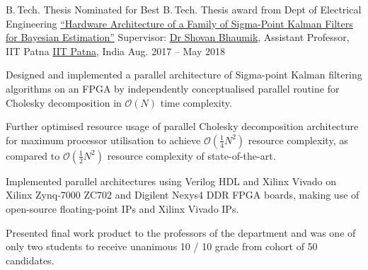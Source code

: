 \begin{cvexperience}
\cvposition
	{B.\,Tech. Thesis\quad\textbar\quad {} {\acvHeaderIconSep} {} Nominated for Best B.\,Tech. Thesis award from Dept of Electrical Engineering} %
	{\href{https://github.com/hatimak/sigma}{``Hardware Architecture of a Family of Sigma-Point Kalman Filters for Bayesian Estimation''}} %
	{Supervisor: \href{http://www.tutorialpoint.org/ShovanBhaumik/index.html}{Dr Shovan Bhaumik}, Assistant Professor, IIT Patna} %
	{\href{https://www.iitp.ac.in}{IIT Patna}, India  {\acvHeaderIconSep{}} {} } %
	{Aug. 2017 -- May 2018  {\acvHeaderIconSep{}} {} } %
	{\begin{cvitems} %
		\item {Designed and implemented a parallel architecture of Sigma-point Kalman filtering algorithms on an FPGA by independently conceptualised parallel routine for Cholesky decomposition in $\mathcal{O} \left( N \right)$ time complexity.}
		\item {Further optimised resource usage of parallel Cholesky decomposition architecture for maximum processor utilisation to achieve $\mathcal{O} \left( \frac{1}{4} N^2 \right)$ resource complexity, as compared to $\mathcal{O} \left( \frac{1}{2} N^2 \right)$ resource complexity of state-of-the-art.}
		\item {Implemented parallel architectures using Verilog HDL and Xilinx Vivado on Xilinx Zynq-7000 ZC702 and Digilent Nexys4 DDR FPGA boards, making use of open-source floating-point IPs and Xilinx Vivado IPs.}
		\item {Presented final work product to the professors of the department and was one of only two students to receive unanimous 10 / 10 grade from cohort of 50 candidates.}
	\end{cvitems}}


\end{cvexperience}
